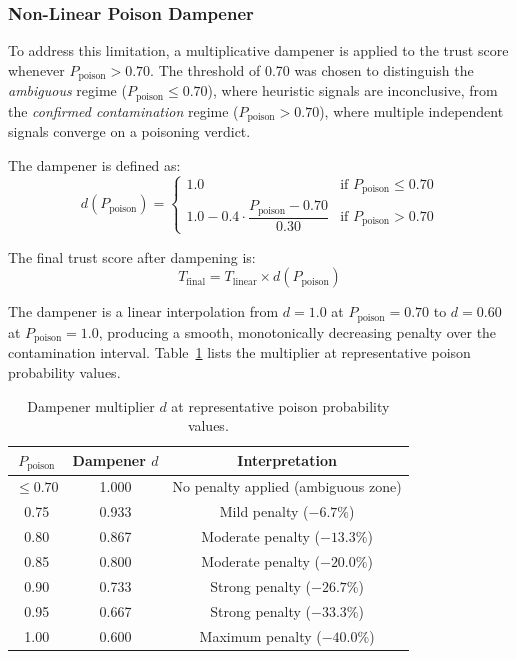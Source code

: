 \subsubsection{Non-Linear Poison Dampener}
\label{subsubsec:dampener}

To address this limitation, a multiplicative dampener is applied to the trust score whenever
$P_{\text{poison}} > 0.70$. The threshold of 0.70 was chosen to distinguish the
\textit{ambiguous} regime ($P_{\text{poison}} \leq 0.70$), where heuristic signals are
inconclusive, from the \textit{confirmed contamination} regime ($P_{\text{poison}} > 0.70$),
where multiple independent signals converge on a poisoning verdict.

The dampener is defined as:
\begin{equation}
\label{eq:dampener}
d(P_{\text{poison}}) =
\begin{cases}
1.0 & \text{if } P_{\text{poison}} \leq 0.70 \\[4pt]
1.0 - 0.4 \cdot \dfrac{P_{\text{poison}} - 0.70}{0.30} & \text{if } P_{\text{poison}} > 0.70
\end{cases}
\end{equation}

The final trust score after dampening is:
\begin{equation}
\label{eq:trust_final}
T_{\text{final}} = T_{\text{linear}} \times d(P_{\text{poison}})
\end{equation}

The dampener is a linear interpolation from $d = 1.0$ at $P_{\text{poison}} = 0.70$ to
$d = 0.60$ at $P_{\text{poison}} = 1.0$, producing a smooth, monotonically decreasing
penalty over the contamination interval. Table~\ref{tab:dampener_values} lists the
multiplier at representative poison probability values.

\begin{table}[h]
\centering
\caption{Dampener multiplier $d$ at representative poison probability values.}
\label{tab:dampener_values}
\begin{tabular}{ccc}
\hline
$P_{\text{poison}}$ & Dampener $d$ & Interpretation \\
\hline
$\leq 0.70$ & 1.000 & No penalty applied (ambiguous zone) \\
0.75        & 0.933 & Mild penalty ($-6.7\%$) \\
0.80        & 0.867 & Moderate penalty ($-13.3\%$) \\
0.85        & 0.800 & Moderate penalty ($-20.0\%$) \\
0.90        & 0.733 & Strong penalty ($-26.7\%$) \\
0.95        & 0.667 & Strong penalty ($-33.3\%$) \\
1.00        & 0.600 & Maximum penalty ($-40.0\%$) \\
\hline
\end{tabular}
\end{table}

